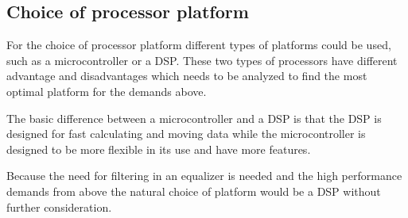 \subsection*{Choice of processor platform}
For the choice of processor platform different types of platforms could be used, such as a microcontroller or a \gls{DSP}. These two types of processors have different advantage and disadvantages which needs to be analyzed to find the most optimal platform for the demands above.

The basic difference between a microcontroller and a \gls{DSP} is that the \gls{DSP} is designed for fast calculating and moving data while the microcontroller is designed to be more flexible in its use and have more features.

Because the need for filtering in an equalizer is needed and the high performance demands from above the natural choice of platform would be a \gls{DSP} without further consideration.     




